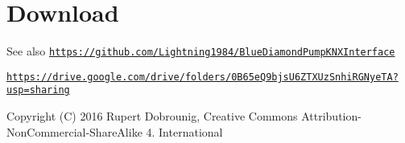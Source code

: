 \hypertarget{index_download_sec}{}\section{Download}\label{index_download_sec}
\begin{DoxySeeAlso}{See also}
\href{https://github.com/Lightning1984/BlueDiamondPumpKNXInterface}{\tt https\-://github.\-com/\-Lightning1984/\-Blue\-Diamond\-Pump\-K\-N\-X\-Interface} 

\href{https://drive.google.com/drive/folders/0B65eQ9bjsU6ZTXUzSnhiRGNyeTA?usp=sharing}{\tt https\-://drive.\-google.\-com/drive/folders/0\-B65e\-Q9bjs\-U6\-Z\-T\-X\-Uz\-Snhi\-R\-G\-Nye\-T\-A?usp=sharing} 
\end{DoxySeeAlso}
\begin{DoxyCopyright}{Copyright}
(C) 2016 Rupert Dobrounig, Creative Commons Attribution-\/\-Non\-Commercial-\/\-Share\-Alike 4. International 
\end{DoxyCopyright}
